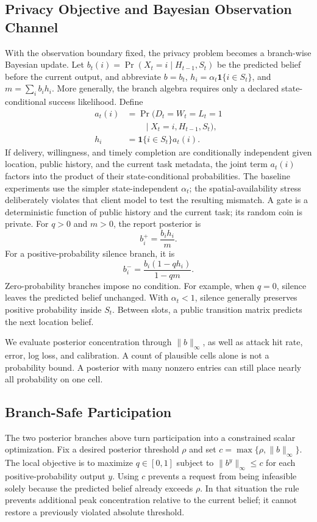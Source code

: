 \documentclass[10pt,journal,compsoc]{IEEEtran}
\newcommand{\ind}{\mathbf{1}}
\begin{document}
\subsection{Privacy Objective and Bayesian Observation Channel}
With the observation boundary fixed, the privacy problem becomes a branch-wise Bayesian update. Let $b_t(i)=\Pr(X_t=i\mid H_{t-1},S_t)$ be the predicted belief before the current output, and abbreviate $b=b_t$, $h_i=\alpha_t\ind\{i\in S_t\}$, and $m=\sum_i b_i h_i$. More generally, the branch algebra requires only a declared state-conditional success likelihood. Define
\[
\begin{aligned}
a_t(i)&=\Pr(D_t=W_t=L_t=1 \\
&\qquad\mid X_t=i,H_{t-1},S_t),\\
h_i&=\ind\{i\in S_t\}a_t(i).
\end{aligned}
\]
If delivery, willingness, and timely completion are conditionally independent given location, public history, and the current task metadata, the joint term $a_t(i)$ factors into the product of their state-conditional probabilities. The baseline experiments use the simpler state-independent $\alpha_t$; the spatial-availability stress deliberately violates that client model to test the resulting mismatch. A gate is a deterministic function of public history and the current task; its random coin is private. For $q>0$ and $m>0$, the report posterior is
\begin{equation}
 b_i^+=\frac{b_i h_i}{m}.
 \label{eq:positive}
\end{equation}
For a positive-probability silence branch, it is
\begin{equation}
 b_i^-=\frac{b_i(1-qh_i)}{1-qm}.
 \label{eq:silence}
\end{equation}
Zero-probability branches impose no condition. For example, when $q=0$, silence leaves the predicted belief unchanged. With $\alpha_t<1$, silence generally preserves positive probability inside $S_t$. Between slots, a public transition matrix predicts the next location belief.

We evaluate posterior concentration through $\|b\|_\infty$, as well as attack hit rate, error, log loss, and calibration. A count of plausible cells alone is not a probability bound. A posterior with many nonzero entries can still place nearly all probability on one cell.

\subsection{Branch-Safe Participation}
The two posterior branches above turn participation into a constrained scalar optimization. Fix a desired posterior threshold $\rho$ and set $c=\max\{\rho,\|b\|_\infty\}$. The local objective is to maximize $q\in[0,1]$ subject to $\|b^y\|_\infty\le c$ for each positive-probability output $y$. Using $c$ prevents a request from being infeasible solely because the predicted belief already exceeds $\rho$. In that situation the rule prevents additional peak concentration relative to the current belief; it cannot restore a previously violated absolute threshold.
\end{document}

